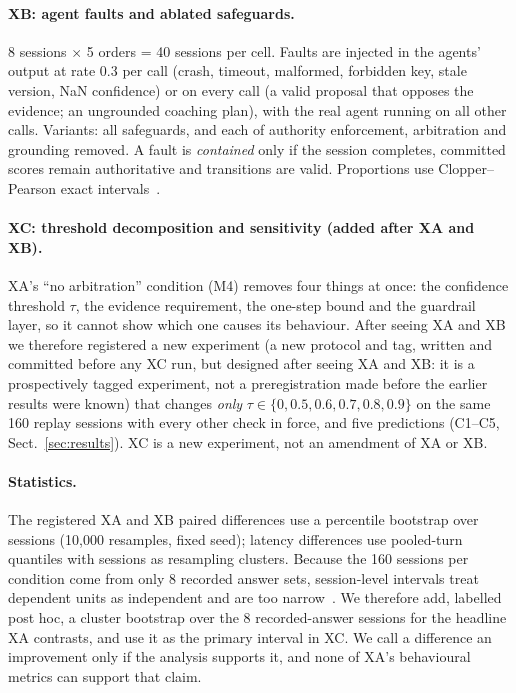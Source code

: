 \paragraph{XB: agent faults and ablated safeguards.} 8 sessions $\times$ 5 orders = 40 sessions per cell. Faults are injected in the agents' output at rate 0.3 per call (crash, timeout, malformed, forbidden key, stale version, NaN confidence) or on every call (a valid proposal that opposes the evidence; an ungrounded coaching plan), with the real agent running on all other calls. Variants: all safeguards, and each of authority enforcement, arbitration and grounding removed. A fault is \emph{contained} only if the session completes, committed scores remain authoritative and transitions are valid. Proportions use Clopper--Pearson exact intervals~\cite{cp34}.

\paragraph{XC: threshold decomposition and sensitivity (added after XA and XB).} XA's ``no arbitration'' condition (M4) removes four things at once: the confidence threshold $\tau$, the evidence requirement, the one-step bound and the guardrail layer, so it cannot show which one causes its behaviour. After seeing XA and XB we therefore registered a new experiment (a new protocol and tag, written and committed before any XC run, but designed after seeing XA and XB: it is a prospectively tagged experiment, not a preregistration made before the earlier results were known) that changes \emph{only} $\tau\in\{0,0.5,0.6,0.7,0.8,0.9\}$ on the same 160 replay sessions with every other check in force, and five predictions (C1--C5, Sect.~\ref{sec:results}). XC is a new experiment, not an amendment of XA or XB.

\paragraph{Statistics.} The registered XA and XB paired differences use a percentile bootstrap over sessions (10{,}000 resamples, fixed seed); latency differences use pooled-turn quantiles with sessions as resampling clusters. Because the 160 sessions per condition come from only 8 recorded answer sets, session-level intervals treat dependent units as independent and are too narrow~\cite{fw07}. We therefore add, labelled post hoc, a cluster bootstrap over the 8 recorded-answer sessions for the headline XA contrasts, and use it as the primary interval in XC. We call a difference an improvement only if the analysis supports it, and none of XA's behavioural metrics can support that claim.

